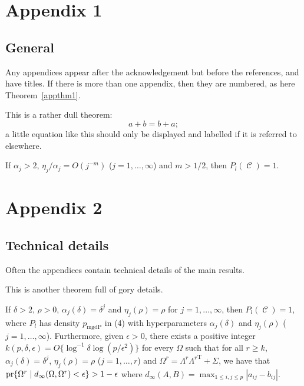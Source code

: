 \documentclass[lineno]{biometrika}
\def\T{{ \mathrm{\scriptscriptstyle T} }}
\DeclareMathOperator{\Thetabb}{\mathcal{C}}
\begin{document}
\appendix

\appendixone
\section*{Appendix 1}
\subsection*{General}

Any appendices appear after the acknowledgement but before the references, and have titles. If there is more than one appendix, then they are numbered,  as here Theorem~\ref{appthm1}.

\begin{theorem}\label{appthm1}
This is a rather dull theorem:
\begin{equation}
\label{A1}
a + b = b + a;
\end{equation}
a little equation like this should only be displayed and labelled if it is referred to  elsewhere. 
\end{theorem}

\begin{lemma}\label{lem:gdp-1}
If $\alpha_j > 2$, $\eta_j/\alpha_j = O(j^{-m})$ ($j=1, \ldots,
\infty$) and $m > 1/2$, then $P_{l} (\Thetabb)= 1$.
\end{lemma}



\vspace*{-10pt}
\appendixtwo
\section*{Appendix 2}
\subsection*{Technical details}

Often the appendices contain technical details of the main results.

\begin{theorem}
This is another theorem full of gory details.
\end{theorem}

\begin{lemma}\label{lem:gdp-2}
If $\delta > 2$, $\rho > 0$, $\alpha_j(\delta) = \delta^j$ and
$\eta_j(\rho) = \rho$ for $j = 1, \ldots, \infty$, then $P_{l}
(\Thetabb) = 1$, where $P_{l}$ has density $p_{\mathrm{mgdP}}$ in
(4) with hyperparameters $\alpha_j(\delta)$ and
$\eta_j(\rho)$ ($j = 1, \ldots, \infty$). Furthermore, given
$\epsilon > 0$, there exists a positive integer $k(p, \delta,
\epsilon)= O\{\log^{-1} \delta \log ({p}/{\epsilon^2})\}$ for every
$\Omega$ such that for all $r \geq k$, $\alpha_j(\delta)=\delta^j$,
$\eta_j(\rho)=\rho$ ($j=1, \ldots, r$) and $\Omega^{r} = \Lambda^{r}
{\Lambda^r}^{\T} + \Sigma$, we have that ${\rm pr}\{\Omega^{r} \mid
d_{\infty}(\Omega, \Omega^{r}) < \epsilon\} > 1 - \epsilon$ where
$d_{\infty}(A, B) = {\max}_{1 \leq i,j \leq p}|a_{ij} - b_{ij}|$.
\end{lemma}
\end{document}
